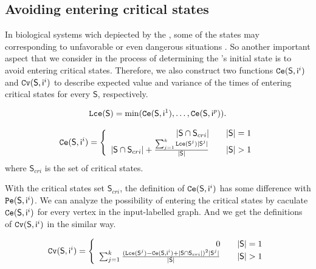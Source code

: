 \subsection{Avoiding entering critical states}
In biological systems wich depiected by the \BCNs, some of the states may corresponding to unfavorable or even dangerous situations \cite{Li2014Controllability}. So another important aspect that we consider in the process of determining the \BCN's initial state is to avoid entering critical states. Therefore, we also construct two functions ${\tt Ce}(\mathsf{S}, \mathsf{ i}^{i})$ and ${\tt Cv}(\mathsf{S}, \mathsf{ i}^{i})$ to describe expected value and variance of the times of entering critical states for every $\mathsf{S}$, respectively. 
\begin{definition} \label{lce}
\begin{equation}
\begin{split}
{\tt Lce}(\mathsf{S})= \min({\tt Ce}(\mathsf{S}, \mathsf{ i}^{1}),\ldots,{\tt Ce}(\mathsf{S}, \mathsf{ i}^{p})).
\end{split}
\end{equation}
\end{definition}
\begin{definition} 
\[\Ce(\mathsf{S}, \mathsf{ i}^{i})=\left\{
\begin{array}{rcl}
|\mathsf{S} \cap \mathsf{S}_{cri} |      &      & {|\mathsf{S}|=1}\\
|\mathsf{S} \cap \mathsf{S}_{cri}| +\frac{\sum_{j=1}^k \Lce(\mathsf{S}^{j})|\mathsf{S}^{j}|}{ |\mathsf{S}|}     &      & {|\mathsf{S}|>1}
\end{array} \right. \]
where $\mathsf{S}_{cri}$ is the set of critical states.
\end{definition}

With the critical states set $\mathsf{S}_{cri}$, the definition of ${\tt Ce}(\mathsf{S}, \mathsf{ i}^{i})$ has some difference with ${\tt Pe}(\mathsf{S}, \mathsf{ i}^{i})$. We can analyze the possibility of entering the critical states by caculate ${\tt Ce}(\mathsf{S}, \mathsf{ i}^{i})$ for every vertex in the input-labelled graph. And we get the definitions of ${\tt Cv}(\mathsf{S}, \mathsf{ i}^{i})$ in the similar way.

\begin{definition} 
\[\Cv(\mathsf{S}, \mathsf{ i}^{i})=\left\{
\begin{array}{rcl}
0     &      & {|\mathsf{S}|=1}\\
\sum_{j=1}^k\frac{ (\Lce(\mathsf{S}^{j})-\Ce(\mathsf{S}, \mathsf{ i}^{i})+|\mathsf{S} \cap \mathsf{S}_{cri}|)^2 |\mathsf{S}^{j}|}{ |\mathsf{S}|}    &      & {|\mathsf{S}|>1}
\end{array} \right. \]
\end{definition}

